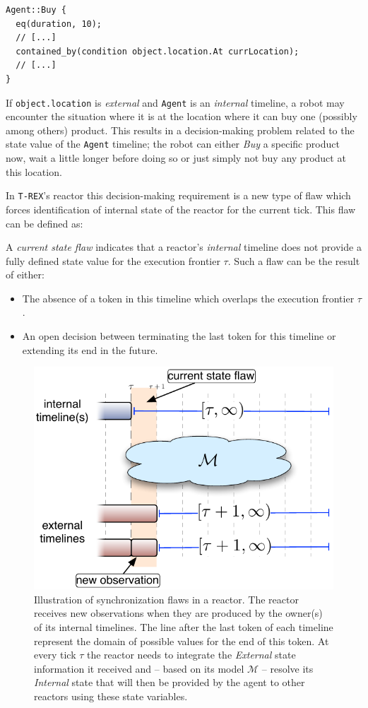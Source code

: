 \begin{verbatim}
Agent::Buy {
  eq(duration, 10);
  // [...]
  contained_by(condition object.location.At currLocation);
  // [...]
}
\end{verbatim}

If \texttt{object.location} is {\em external} and \texttt{Agent} is an
{\em internal} timeline, a robot may encounter the situation where it
is at the location where it can buy one (possibly among others)
product. This results in a decision-making problem related to the
state value of the \texttt{Agent} timeline; the robot can either {\em
  Buy} a specific product now, wait a little longer before doing so or
just simply not buy any product at this location.

In \texttt{T-REX}'s \eu reactor this decision-making requirement is a
new type of flaw which forces identification  of internal
state of the reactor for the current tick. This flaw can be defined
as:

\begin{definition}
  \label{def:csf}
  A {\em current state flaw} indicates that a reactor's {\em internal}
  timeline does not provide a fully defined state value for the
  execution frontier $\tau$. Such a flaw can be the result of either:

  \begin{itemize}
  \item The absence of a token in this timeline which overlaps the
    execution frontier $\tau$.
  \item An open decision between terminating the last token for this
    timeline or extending its end in the future.
  \end{itemize}

\end{definition} 

\begin{figure}[!htbp]
  \centering
  \includegraphics[width=0.5\columnwidth]{figs/synch-relation}
  \caption{\small Illustration of synchronization flaws in a
    reactor. The reactor receives new observations when they are
    produced by the owner(s) of its internal timelines. The line
     after the last token of each timeline
    represent the domain of possible values for the end of this
    token. At every tick $\tau$ the reactor needs to integrate the
    {\em External} state information it received and -- based on its
    model $\mathcal{M}$ -- resolve its {\em Internal} state that will
    then be provided by the agent to other reactors using these state
    variables.}
  \label{fig:synch:flaw}
\end{figure}


